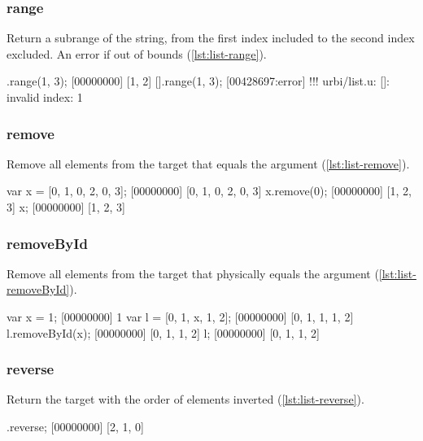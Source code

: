 \subsubsection{range}

Return a subrange of the string, from the first index included to the
second index excluded. An error if out of bounds (\autoref{lst:list-range}).

\begin{urbiscript}[caption=List.range, label=lst:list-range]
[0, 1, 2, 3].range(1, 3);
[00000000] [1, 2]
[].range(1, 3);
[00428697:error] !!! urbi/list.u: []: invalid index: 1
\end{urbiscript}


\subsubsection{remove}

Remove all elements from the target that equals the argument
(\autoref{lst:list-remove}).

\begin{urbiscript}[caption=List.remove, label=lst:list-remove]
var x = [0, 1, 0, 2, 0, 3];
[00000000] [0, 1, 0, 2, 0, 3]
x.remove(0);
[00000000] [1, 2, 3]
x;
[00000000] [1, 2, 3]
\end{urbiscript}

\subsubsection{removeById}

Remove all elements from the target that physically equals the
argument (\autoref{lst:list-removeById}).

\begin{urbiscript}[caption=List.removeById, label=lst:list-removeById]
var x = 1;
[00000000] 1
var l = [0, 1, x, 1, 2];
[00000000] [0, 1, 1, 1, 2]
l.removeById(x);
[00000000] [0, 1, 1, 2]
l;
[00000000] [0, 1, 1, 2]
\end{urbiscript}

\subsubsection{reverse}

Return the target with the order of elements inverted
(\autoref{lst:list-reverse}).

\begin{urbiscript}[caption=List.reverse, label=lst:list-reverse]
[0, 1, 2].reverse;
[00000000] [2, 1, 0]
\end{urbiscript}


